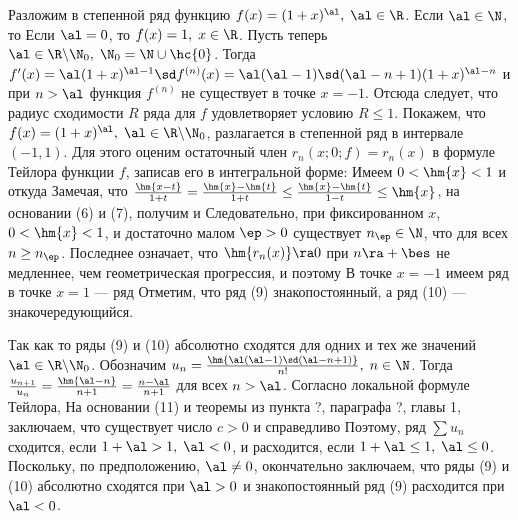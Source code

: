 \documentclass[a4paper]{article}
\begin{document}
Разложим в степенной ряд функцию $f(x)=(1+x)^{\al}, \; \al\in\R$.
Если $\al\in\N$, то  Если $\al=0$, то $f(x)=1, \; x\in\R$.
Пусть теперь $\al\in\R\backslash\N_0, \; \N_0=\N\cup\hc{0}$. Тогда
$f'(x) = \al(1+x)^{\al-1} \sd f^{(n)}(x) = \al(\al-1)\sd
(\al-n+1)(1+x)^{\al-n}$ и при $n>\al$ функция $f^{(n)}$ не
существует в точке $x=-1$. Отсюда следует, что радиус сходимости $R$
ряда для $f$ удовлетворяет условию $R\le1$. Покажем, что
$f(x)=(1+x)^{\al}, \; \al\in\R\backslash\N_0$, разлагается в
степенной ряд в интервале $(-1,1)$. Для этого оценим остаточный член
$r_n(x;0;f)=r_n(x)$ в формуле Тейлора функции $f$, записав его в
интегральной форме:  Имеем $0<\hm{x}<1$ и  откуда  Замечая, что $\frac{\hm{x-t}}{1+t}
= \frac{\hm{x}-\hm{t}}{1+t} \le \frac{\hm{x}-\hm{t}}{1-t} \le
\hm{x}$, на основании (6) и (7), получим  и
 Следовательно,
при фиксированном $x$, $0<\hm{x}<1$, и достаточно малом $\ep>0$
существует $n_{\ep}\in\N$, что
 для всех $n\ge n_{\ep}$.
Последнее означает, что $\hm{r_n(x)}\ra0$ при $n\ra+\bes$ не
медленнее, чем геометрическая прогрессия, и поэтому
 В точке $x=-1$
имеем ряд  в точке $x=1$ --- ряд
 Отметим, что
ряд (9) знакопостоянный, а ряд (10) --- знакочередующийся.

Так как  то ряды (9) и (10)
абсолютно сходятся для одних и тех же значений
$\al\in\R\backslash\N_0$. Обозначим $u_n = \frac{\hm{\al(\al-1)\sd
(\al-n+1)}}{n!}, \; n\in\N$. Тогда $\frac{u_{n+1}}{u_n} =
\frac{\hm{\al-n}}{n+1} = \frac{n-\al}{n+1}$ для всех $n>\al$.
Согласно локальной формуле Тейлора,  На основании
(11) и теоремы из пункта ?, параграфа ?, главы 1, заключаем, что
существует число $c>0$ и справедливо  Поэтому, ряд $\sum u_n$
сходится, если $1+\al>1, \; \al<0$, и расходится, если $1+\al\le1,
\; \al\le0$. Поскольку, по предположению, $\al\ne0$, окончательно
заключаем, что ряды (9) и (10) абсолютно сходятся при $\al>0$ и
знакопостоянный ряд (9) расходится при $\al<0$.
\end{document}
